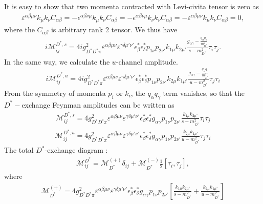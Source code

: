 \documentclass[aps,prd,preprintnumbers,showpacs,showkeys,nofootinbib,
superscriptaddress,fleqn,floatfix,tightenlines, 10pt]{revtex4-1}
\begin{document}
It is easy to show that two momenta contracted with Levi-civita tensor is zero as
\begin{align}
	\varepsilon^{\alpha \beta \mu \nu} k_\mu k_\nu C_{\alpha \beta}
	= - \epsilon^{\alpha \beta \nu \mu} k_\mu k_\nu C_{\alpha \beta}
	= - \epsilon^{\alpha \beta \nu \mu} k_\nu k_\nu C_{\alpha \beta}
	= - \varepsilon^{\alpha \beta \mu \nu} k_\mu k_\nu C_{\alpha \beta} = 0,
\end{align}
where the $C_{\alpha \beta}$ is arbitrary rank 2 tensor. We thus have
\begin{align}
	i\mathcal{M}_{ij}^{D^*,s} = 4i g_{D^*D^*\pi}^2 \varepsilon^{\alpha \beta \mu \nu}
	\varepsilon^{\gamma \delta \mu' \nu'} \epsilon_\beta^* \epsilon_\delta^* p_{1\nu}
	p_{2\nu'} k_{1\mu} k_{2\mu'} \frac{g_{\alpha \gamma} - \frac{q_\alpha q_\gamma}{m_{D^*}^2}}
	{s - m_{D^*}^2} \tau_i \tau_j .
\end{align}
In the same way, we calculate the $u$-channel amplitude.
\begin{align}
	i\mathcal{M}_{ij}^{D^*,u} = 4i g_{D^*D^*\pi}^2 \varepsilon^{\alpha \beta \mu \nu}
	\varepsilon^{\gamma \delta \mu' \nu'} \epsilon_\beta^* \epsilon_\delta^* p_{1\nu}
	p_{2\nu'} k_{2\mu} k_{1\mu'} \frac{g_{\alpha \gamma} - \frac{q_\alpha q_\gamma}{m_{D^*}^2}}
	{u - m_{D^*}^2} \tau_j \tau_i
\end{align}
From the symmetry of momenta $p_i$ or $k_i$, the $q_\alpha q_\gamma$ term vanishes, so that
the $D^*-$exchange Feynman amplitudes can be written as
\begin{align}
	\mathcal{M}_{ij}^{D^*,s} = 4g_{D^*D^*\pi}^2 \varepsilon^{\alpha \beta \mu \nu}
	\varepsilon^{\gamma \delta \mu' \nu'} \epsilon_\beta^* \epsilon_\delta^*
	g_{\alpha \gamma} p_{1\nu} p_{2\nu'} \frac{k_{1\mu} k_{2\mu'}}
	{s - m_{D^*}^2} \tau_i \tau_j
\end{align}
\begin{align}
	\mathcal{M}_{ij}^{D^*,u} = 4g_{D^*D^*\pi}^2 \varepsilon^{\alpha \beta \mu \nu}
	\varepsilon^{\gamma \delta \mu' \nu'} \epsilon_\beta^* \epsilon_\delta^*
	g_{\alpha \gamma} p_{1\nu} p_{2\nu'} \frac{k_{2\mu} k_{1\mu'}}
	{u - m_{D^*}^2} \tau_j \tau_i
\end{align}
The total $D^*$-exchange diagram :
\begin{align}
	\mathcal{M}_{ij}^{D^*} = \mathcal{M}_{D^*}^{(+)} \delta_{ij} + \mathcal{M}_{D^*}^{(-)}
	\frac{1}{2} [\tau_i, \tau_j],
\end{align}
where
\begin{align}
	\mathcal{M}_{D^*}^{(+)} = 4g_{D^*D^*\pi}^2 \varepsilon^{\alpha \beta \mu \nu}
	\varepsilon^{\gamma \delta \mu' \nu'} \epsilon_\beta^* \epsilon_\delta^*
	g_{\alpha \gamma} p_{1\nu} p_{2\nu'} \left[
	\frac{k_{1\mu} k_{2\mu'}}{s - m_{D^*}^2} + \frac{k_{2\mu} k_{1\mu'}}{u - m_{D^*}^2}\right]
\end{align}
\end{document}
